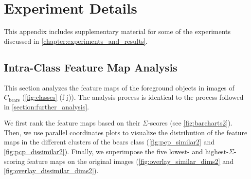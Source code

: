 \clearpage  %
\begin{appendices}
\end{appendices}
\clearpage %

\chapter{Experiment Details}\label{chapter:experiment_details}

This appendix includes supplementary material for some of the experiments discussed in \autoref{chapter:experiments_and_results}.

\section{Intra-Class Feature Map Analysis}\label{appendix:s_bears_analysis}

This section analyzes the feature maps of the foreground objects in images of $C_{\text{bears}}$ (\autoref{fig:classes} (f-j)). The analysis process is identical to the process followed in \autoref{section:further_analysis}. 

We first rank the feature maps based on their $\Sigma$-scores (see \autoref{fig:barcharts2}). Then, we use parallel coordinates plots to visualize the distribution of the feature maps in the different clusters of the bears class (\autoref{fig:pcp_similar2} and \autoref{fig:pcp_dissimilar2}). Finally, we superimpose the five lowest- and highest-$\Sigma$-scoring feature maps on the original images (\autoref{fig:overlay_similar_dims2} and \autoref{fig:overlay_dissimilar_dims2}).

